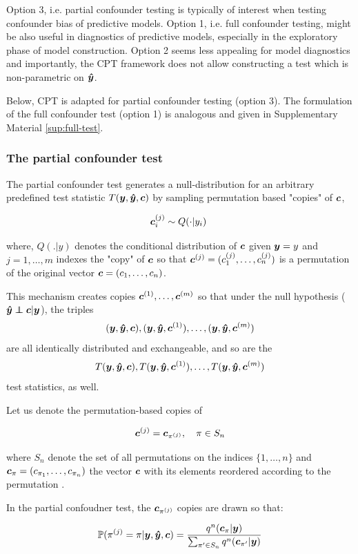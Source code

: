 \documentclass{article}
\begin{document}
Option 3, i.e. partial confounder testing is typically of interest when testing confounder bias of predictive models. Option 1, i.e. full confounder testing, might be also useful in diagnostics of predictive models, especially in the exploratory phase of model construction. Option 2 seems less appealing for model diagnostics and importantly, the CPT framework does not allow constructing a test which is non-parametric on $\boldsymbol{\hat{y}}$.

Below, CPT is adapted for partial confounder testing (option 3). The formulation of the full confounder test (option 1) is analogous and given in Supplementary Material \ref{sup:full-test}.

\subsubsection*{The partial confounder test}

The partial confounder test generates a null-distribution for an arbitrary predefined test statistic $T(\boldsymbol{y},\boldsymbol{\hat{y}},\boldsymbol{c})$ by sampling permutation based "copies" of $\boldsymbol{c}$,

$$\c_i^{(j)} \sim Q(\cdot|y_i) \ $$

where, $Q(.|y)$ denotes the conditional distribution of $\boldsymbol{c}$ given $\boldsymbol{y}=y$ and $j=1,\dots, m$ indexes the "copy" of $\boldsymbol{c}$ so that $\boldsymbol{c}^{(j)} = (c_1^{(j)}, \dots, c_n^{(j)})$ is a permutation of the original vector $\boldsymbol{c} = (c_1, \dots, c_n)$. 

This mechanism creates copies $\boldsymbol{c}^{(1)}, \dots ,\boldsymbol{c}^{(m)}$ so that under the null hypothesis ($\yhat \independent \c | \y$), the triples $$(\boldsymbol{y},\boldsymbol{\hat{y}},\boldsymbol{c}), (\boldsymbol{y}, \boldsymbol{\hat{y}}, \boldsymbol{c}^{(1)}),\dots, (\boldsymbol{y}, \boldsymbol{\hat{y}}, \boldsymbol{c}^{(m)})$$ are all identically distributed and exchangeable, and so are the 
$$T(\boldsymbol{y},\boldsymbol{\hat{y}},\boldsymbol{c}), T(\boldsymbol{y}, \boldsymbol{\hat{y}}, \boldsymbol{c}^{(1)}),\dots,T(\boldsymbol{y}, \boldsymbol{\hat{y}}, \boldsymbol{c}^{(m)})$$
test statistics, as well.

Let us denote the permutation-based copies of 

$$\boldsymbol{c}^{(j)} = \boldsymbol{c}_{\pi^{(j)}}, \quad \pi \in S_n$$

where $S_n$ denote the set of all permutations on the indices $\{1,\dots,n\}$ and $\boldsymbol{c}_\pi = (c_{\pi_1}, \dots, c_{\pi_n})$ the vector $\boldsymbol{c}$ with its elements reordered according to the permutation .

In the partial confoudner test, the $\boldsymbol{c}_{\pi^{(j)}}$ copies are drawn so that:

\begin{equation}
    \mathbb{P}(\pi^{(j)} = \pi | \boldsymbol{y},\boldsymbol{\hat{y}},\boldsymbol{c}) = \frac{q^n(\boldsymbol{c}_\pi | \boldsymbol{y})}{\sum_{\pi' \in S_n} q^n(\boldsymbol{c}_{\pi'} | \boldsymbol{y})}
    \label{eq-pperm}
\end{equation}
\end{document}

